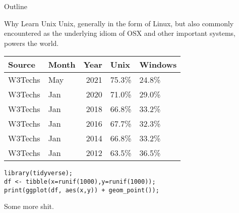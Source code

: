 \documentclass[presentation]{beamer}
\author{Vincent Toups}
\date{\today}
\title{}
\begin{document}
\begin{frame}{Outline}
\tableofcontents
\end{frame}

\begin{frame}[label={sec:orgfc49186},fragile]{Why Learn Unix}
 Unix, generally in the form of Linux, but also commonly encountered as
the underlying idiom of OSX and other important systems, powers the
world.

\begin{table}[htbp]
\label{tab:org474670e}
\centering
\begin{tabular}{llrll}
Source & Month & Year & Unix & Windows\\
\hline
W3Techs & May & 2021 & 75.3\% & 24.8\%\\
W3Techs & Jan & 2020 & 71.0\% & 29.0\%\\
W3Techs & Jan & 2018 & 66.8\% & 33.2\%\\
W3Techs & Jan & 2016 & 67.7\% & 32.3\%\\
W3Techs & Jan & 2014 & 66.8\% & 33.2\%\\
W3Techs & Jan & 2012 & 63.5\% & 36.5\%\\
\end{tabular}
\end{table}


\begin{verbatim}
library(tidyverse);
df <- tibble(x=runif(1000),y=runif(1000));
print(ggplot(df, aes(x,y)) + geom_point());  
\end{verbatim}

Some more shit.
\end{frame}
\end{document}
